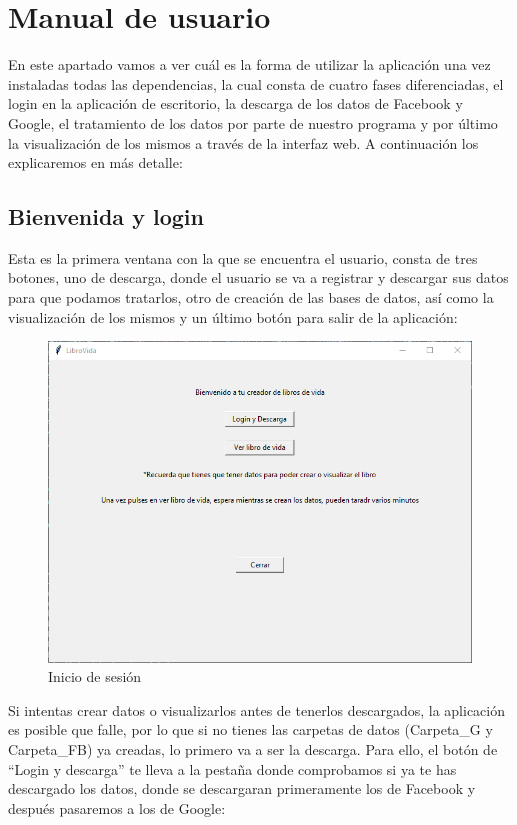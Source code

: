 \section{Manual de usuario}

En este apartado vamos a ver cuál es la forma de utilizar la aplicación una vez instaladas todas las dependencias, la cual consta de cuatro fases diferenciadas, el login en la aplicación de escritorio, la descarga de los datos de Facebook y Google, el tratamiento de los datos por parte de nuestro programa y por último la visualización de los mismos a través de la interfaz web. A continuación los explicaremos en más detalle:

\subsection{Bienvenida y login}
Esta es la primera ventana con la que se encuentra el usuario, consta de tres botones, uno de descarga, donde el usuario se va a registrar y descargar sus datos para que podamos tratarlos, otro de creación de las bases de datos, así como la visualización de los mismos y un último botón para salir de la aplicación:
\begin{figure}
	\begin{center}
		\includegraphics[scale=0.7]{Imagenes/Fuentes/PantallaPrincipalOpciones.png} 
		\caption{Inicio de sesión}
		\label{PantallaPrincipalOpciones}
	\end{center}
\end{figure}

Si intentas crear datos o visualizarlos antes de tenerlos descargados, la aplicación es posible que falle, por lo que si no tienes las carpetas de datos (Carpeta\_G y Carpeta\_FB) ya creadas, lo primero va a ser la descarga. Para ello, el botón de  ``Login y descarga'' te lleva a la pestaña donde comprobamos si ya te has descargado los datos, donde se descargaran primeramente los de Facebook y después pasaremos a los de Google: 


